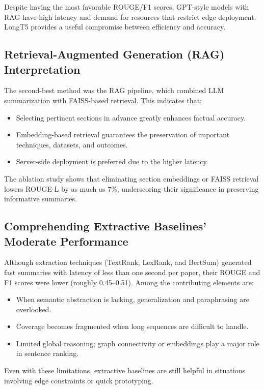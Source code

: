 \documentclass[conference]{IEEEtran}
\begin{document}
Despite having the most favorable ROUGE/F1 scores, GPT-style models with RAG have high latency and demand for resources that restrict edge deployment. LongT5 provides a useful compromise between efficiency and accuracy.

\subsection{Retrieval-Augmented Generation (RAG) Interpretation}

The second-best method was the RAG pipeline, which combined LLM summarization with FAISS-based retrieval. This indicates that:

\begin{itemize}
\item Selecting pertinent sections in advance greatly enhances factual accuracy.
\item Embedding-based retrieval guarantees the preservation of important techniques, datasets, and outcomes.
\item Server-side deployment is preferred due to the higher latency.
\end{itemize}

The ablation study shows that eliminating section embeddings or FAISS retrieval lowers ROUGE-L by as much as 7\%, underscoring their significance in preserving informative summaries.

\subsection{Comprehending Extractive Baselines' Moderate Performance}

Although extraction techniques (TextRank, LexRank, and BertSum) generated fast summaries with latency of less than one second per paper, their ROUGE and F1 scores were lower (roughly 0.45–0.51).
Among the contributing elements are:
\begin{itemize}
\item When semantic abstraction is lacking, generalization and paraphrasing are overlooked.
\item Coverage becomes fragmented when long sequences are difficult to handle.
\item Limited global reasoning; graph connectivity or embeddings play a major role in sentence ranking.
\end{itemize}

Even with these limitations, extractive baselines are still helpful in situations involving edge constraints or quick prototyping.
\end{document}

